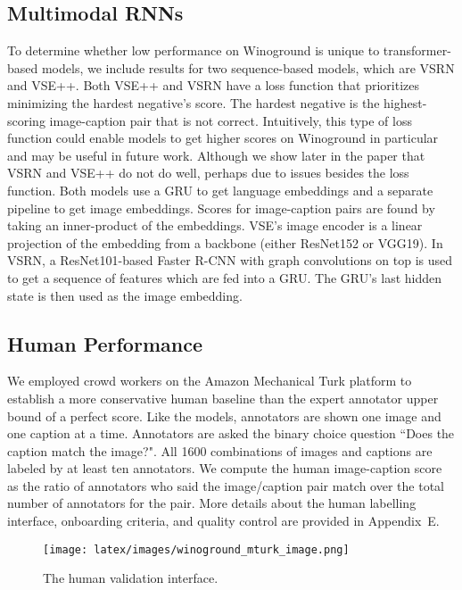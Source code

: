 \documentclass[10pt,twocolumn,letterpaper]{article}
\begin{document}
\subsection{Multimodal RNNs}

To determine whether low performance on Winoground is unique to transformer-based models, we include results for two sequence-based models, which are VSRN\cite{li2019vsrn} and VSE++\cite{faghri2018vse}. Both VSE++ and VSRN have a loss function that prioritizes minimizing the hardest negative's score. The hardest negative is the highest-scoring image-caption pair that is not correct. Intuitively, this type of loss function could enable models to get higher scores on Winoground in particular and may be useful in future work. Although we show later in the paper that VSRN and VSE++ do not do well, perhaps due to issues besides the loss function. Both models use a GRU\cite{chung2014gru} to get language embeddings and a separate pipeline to get image embeddings. Scores for image-caption pairs are found by taking an inner-product of the embeddings. VSE's image encoder is a linear projection of the embedding from a backbone (either ResNet152\cite{he2016deep} or VGG19\cite{simonyan2015very}). In VSRN, a ResNet101-based Faster R-CNN with graph convolutions on top is used to get a sequence of features which are fed into a GRU. The GRU's last hidden state is then used as the image embedding.

\subsection{Human Performance}\label{sec:human-perf}

We employed crowd workers on the Amazon Mechanical Turk platform to establish a more conservative human baseline than the expert annotator upper bound of a perfect score.
Like the models, annotators are shown one image and one caption at a time. Annotators are asked the binary choice question ``Does the caption match the image?".
All 1600 combinations of images and captions are labeled by at least ten annotators.
We compute the human image-caption score as the ratio of annotators who said the image/caption pair match over the total number of annotators for the pair. More details about the human labelling interface, onboarding criteria, and quality control are provided in Appendix~E.

\begin{figure}[!t]\centering
    \texttt{[image: latex/images/winoground\_mturk\_image.png]}\caption{The human validation interface.}\label{fig:teaser-ex}\end{figure}
\fi
\end{document}
